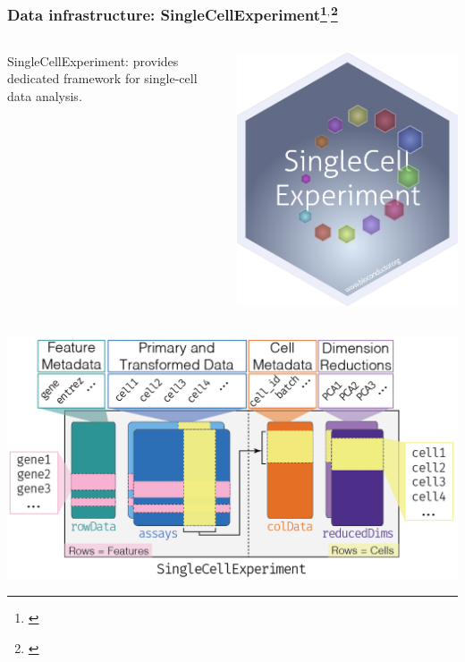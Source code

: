 \documentclass{beamer}
\newcommand{\hcode}[2][lgray]{{\ttfamily\color{vdgray}\colorbox{#1}{#2}}}
\newcommand{\frametitlesection}[1]{\frametitle{\centering #1 \footnotesize \hspace{0pt plus 1 filll} \insertsection}}
\begin{document}
\begin{frame}
    \frametitlesection{Data infrastructure: SingleCellExperiment\footnote{\citet{sce}}$^,$\footnote{\citet{Amezquita2019-bf}}}
    \begin{columns}
        \begin{column}{0.8\textwidth}
            \hcode{SingleCellExperiment}: provides dedicated framework for 
            single-cell data analysis.
        \end{column}
        \begin{column}{0.2\textwidth}
            \includegraphics[width=\linewidth]{figs/sticker_SingleCellExperiment.png}
        \end{column}  
    \end{columns}
    
    \includegraphics[width=0.9\linewidth]{figs/SingleCellExperiment.png}
    
\end{frame}
\end{document}
